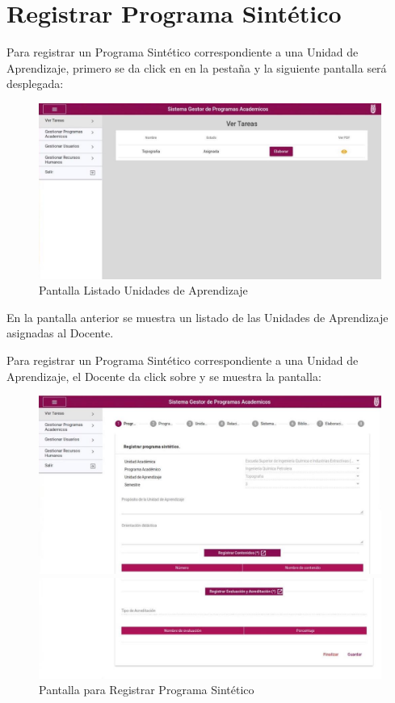 \section{Registrar Programa Sintético}
Para registrar un Programa Sintético correspondiente a una Unidad de Aprendizaje, primero se da click en en la pestaña  y la siguiente pantalla será desplegada:

\begin{figure}[H]
    \centering
    \hypertarget{RegLUA}{\includegraphics[width=0.7\linewidth]{images/SP6/PSListado.jpeg}}
    \caption{Pantalla Listado Unidades de Aprendizaje}
\end{figure}

En la pantalla anterior se muestra un listado de las Unidades de Aprendizaje asignadas al Docente.

Para registrar un Programa Sintético correspondiente a una Unidad de Aprendizaje, el Docente da click sobre  y se muestra la pantalla:

\pagebreak
\begin{figure}[H]
    \centering
    \hypertarget{RegPS}{\includegraphics[width=0.7\linewidth]{images/SP6/PSinicio.jpeg}}
    \includegraphics[width=0.7\linewidth]{images/SP6/PSinicio2.jpeg}
    \caption{Pantalla para Registrar Programa Sintético}
\end{figure}

